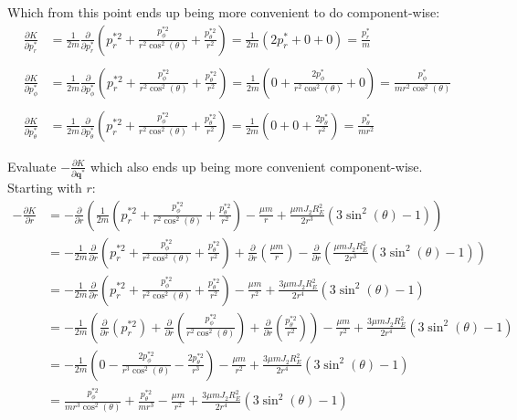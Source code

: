 \documentclass[titlepage]{article}
\begin{document}
Which from this point ends up being more convenient to do component-wise:
\begin{equation}
	\begin{split}
		\frac{\partial K}{\partial p_r^*}&=\frac{1}{2m}\frac{\partial}{\partial p_r^*}\left(p_r^{*2}+\frac{p_\phi^{*2}}{r^2\cos^2(\theta)}+\frac{p_\theta^{*2}}{r^2}\right)=\frac{1}{2m}\left(2p_r^*+0+0\right)=\frac{p_r^*}{m} \\
		\\
		\frac{\partial K}{\partial p_\phi^*}&=\frac{1}{2m}\frac{\partial}{\partial p_\phi^*}\left(p_r^{*2}+\frac{p_\phi^{*2}}{r^2\cos^2(\theta)}+\frac{p_\theta^{*2}}{r^2}\right)=\frac{1}{2m}\left(0+\frac{2p_\phi^*}{r^2\cos^2(\theta)}+0\right)=\frac{p_\phi^*}{mr^2\cos^2(\theta)} \\
		\\
		\frac{\partial K}{\partial p_\theta^*}&=\frac{1}{2m}\frac{\partial}{\partial p_\theta^*}\left(p_r^{*2}+\frac{p_\phi^{*2}}{r^2\cos^2(\theta)}+\frac{p_\theta^{*2}}{r^2}\right)=\frac{1}{2m}\left(0+0+\frac{2p_\theta^*}{r^2}\right)=\frac{p_\theta^*}{mr^2}
		\end{split}
\end{equation}

Evaluate $-\frac{\partial K}{\partial\boldsymbol{q}^*}$ which also ends up being more convenient component-wise. Starting with $r$:
\begin{equation}
	\begin{split}
		-\frac{\partial K}{\partial r}&=-\frac{\partial}{\partial r}\left(\frac{1}{2m}\left(p_r^{*2}+\frac{p_\phi^{*2}}{r^2\cos^2(\theta)}+\frac{p_\theta^{*2}}{r^2}\right)-\frac{\mu m}{r}+\frac{\mu mJ_2R_E^2}{2r^3}\left(3\sin^2(\theta)-1\right)\right) \\
		&=-\frac{1}{2m}\frac{\partial}{\partial r}\left(p_r^{*2}+\frac{p_\phi^{*2}}{r^2\cos^2(\theta)}+\frac{p_\theta^{*2}}{r^2}\right)+\frac{\partial}{\partial r}\left(\frac{\mu m}{r}\right)-\frac{\partial}{\partial r}\left(\frac{\mu mJ_2R_E^2}{2r^3}\left(3\sin^2(\theta)-1\right)\right) \\
		&=-\frac{1}{2m}\frac{\partial}{\partial r}\left(p_r^{*2}+\frac{p_\phi^{*2}}{r^2\cos^2(\theta)}+\frac{p_\theta^{*2}}{r^2}\right)-\frac{\mu m}{r^2}+\frac{3\mu mJ_2R_E^2}{2r^4}\left(3\sin^2(\theta)-1\right) \\
		&=-\frac{1}{2m}\left(\frac{\partial}{\partial r}\left(p_r^{*2}\right)+\frac{\partial}{\partial r}\left(\frac{p_\phi^{*2}}{r^2\cos^2(\theta)}\right)+\frac{\partial}{\partial r}\left(\frac{p_\theta^{*2}}{r^2}\right)\right)-\frac{\mu m}{r^2}+\frac{3\mu mJ_2R_E^2}{2r^4}\left(3\sin^2(\theta)-1\right) \\
		&=-\frac{1}{2m}\left(0-\frac{2p_\phi^{*2}}{r^3\cos^2(\theta)}-\frac{2p_\theta^{*2}}{r^3}\right)-\frac{\mu m}{r^2}+\frac{3\mu mJ_2R_E^2}{2r^4}\left(3\sin^2(\theta)-1\right) \\
		&=\frac{p_\phi^{*2}}{mr^3\cos^2(\theta)}+\frac{p_\theta^{*2}}{mr^3}-\frac{\mu m}{r^2}+\frac{3\mu mJ_2R_E^2}{2r^4}\left(3\sin^2(\theta)-1\right)
	\end{split}
\end{equation}
\end{document}

